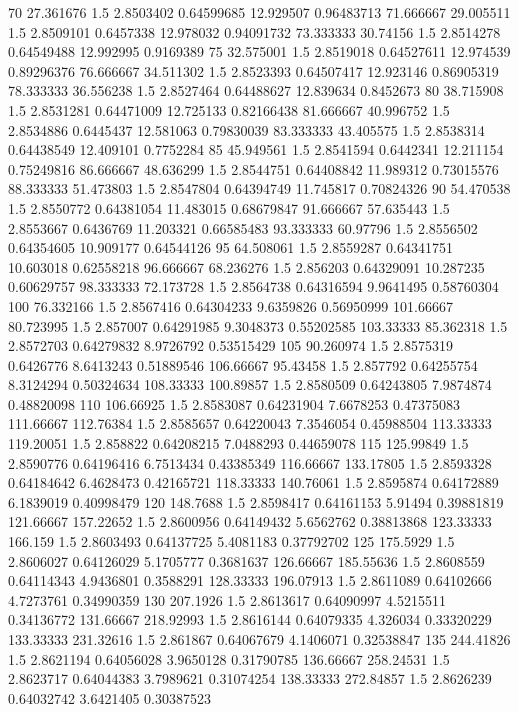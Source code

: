 \documentclass[compact]{ne630handout}
\begin{document}
{70 27.361676 1.5 2.8503402 0.64599685 12.929507 0.96483713
71.666667 29.005511 1.5 2.8509101 0.6457338 12.978032 0.94091732
73.333333 30.74156 1.5 2.8514278 0.64549488 12.992995 0.9169389
75 32.575001 1.5 2.8519018 0.64527611 12.974539 0.89296376
76.666667 34.511302 1.5 2.8523393 0.64507417 12.923146 0.86905319
78.333333 36.556238 1.5 2.8527464 0.64488627 12.839634 0.8452673
80 38.715908 1.5 2.8531281 0.64471009 12.725133 0.82166438
81.666667 40.996752 1.5 2.8534886 0.6445437 12.581063 0.79830039
83.333333 43.405575 1.5 2.8538314 0.64438549 12.409101 0.7752284
85 45.949561 1.5 2.8541594 0.6442341 12.211154 0.75249816
86.666667 48.636299 1.5 2.8544751 0.64408842 11.989312 0.73015576
88.333333 51.473803 1.5 2.8547804 0.64394749 11.745817 0.70824326
90 54.470538 1.5 2.8550772 0.64381054 11.483015 0.68679847
91.666667 57.635443 1.5 2.8553667 0.6436769 11.203321 0.66585483
93.333333 60.97796 1.5 2.8556502 0.64354605 10.909177 0.64544126
95 64.508061 1.5 2.8559287 0.64341751 10.603018 0.62558218
96.666667 68.236276 1.5 2.856203 0.64329091 10.287235 0.60629757
98.333333 72.173728 1.5 2.8564738 0.64316594 9.9641495 0.58760304
100 76.332166 1.5 2.8567416 0.64304233 9.6359826 0.56950999
101.66667 80.723995 1.5 2.857007 0.64291985 9.3048373 0.55202585
103.33333 85.362318 1.5 2.8572703 0.64279832 8.9726792 0.53515429
105 90.260974 1.5 2.8575319 0.6426776 8.6413243 0.51889546
106.66667 95.43458 1.5 2.857792 0.64255754 8.3124294 0.50324634
108.33333 100.89857 1.5 2.8580509 0.64243805 7.9874874 0.48820098
110 106.66925 1.5 2.8583087 0.64231904 7.6678253 0.47375083
111.66667 112.76384 1.5 2.8585657 0.64220043 7.3546054 0.45988504
113.33333 119.20051 1.5 2.858822 0.64208215 7.0488293 0.44659078
115 125.99849 1.5 2.8590776 0.64196416 6.7513434 0.43385349
116.66667 133.17805 1.5 2.8593328 0.64184642 6.4628473 0.42165721
118.33333 140.76061 1.5 2.8595874 0.64172889 6.1839019 0.40998479
120 148.7688 1.5 2.8598417 0.64161153 5.91494 0.39881819
121.66667 157.22652 1.5 2.8600956 0.64149432 5.6562762 0.38813868
123.33333 166.159 1.5 2.8603493 0.64137725 5.4081183 0.37792702
125 175.5929 1.5 2.8606027 0.64126029 5.1705777 0.3681637
126.66667 185.55636 1.5 2.8608559 0.64114343 4.9436801 0.3588291
128.33333 196.07913 1.5 2.8611089 0.64102666 4.7273761 0.34990359
130 207.1926 1.5 2.8613617 0.64090997 4.5215511 0.34136772
131.66667 218.92993 1.5 2.8616144 0.64079335 4.326034 0.33320229
133.33333 231.32616 1.5 2.861867 0.64067679 4.1406071 0.32538847
135 244.41826 1.5 2.8621194 0.64056028 3.9650128 0.31790785
136.66667 258.24531 1.5 2.8623717 0.64044383 3.7989621 0.31074254
138.33333 272.84857 1.5 2.8626239 0.64032742 3.6421405 0.30387523
}
\end{document}
